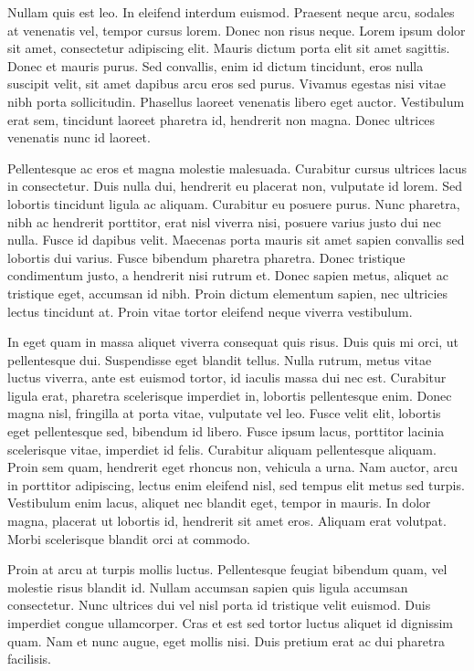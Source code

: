 \documentclass[a4paper]{article}
\begin{document}
Nullam quis est leo. In eleifend interdum euismod. Praesent neque arcu, sodales at venenatis vel, tempor cursus lorem. Donec non risus neque. Lorem ipsum dolor sit amet, consectetur adipiscing elit. Mauris dictum porta elit sit amet sagittis. Donec et mauris purus. Sed convallis, enim id dictum tincidunt, eros nulla suscipit velit, sit amet dapibus arcu eros sed purus. Vivamus egestas nisi vitae nibh porta sollicitudin. Phasellus laoreet venenatis libero eget auctor. Vestibulum erat sem, tincidunt laoreet pharetra id, hendrerit non magna. Donec ultrices venenatis nunc id laoreet.

Pellentesque ac eros et magna molestie malesuada. Curabitur cursus ultrices lacus in consectetur. Duis nulla dui, hendrerit eu placerat non, vulputate id lorem. Sed lobortis tincidunt ligula ac aliquam. Curabitur eu posuere purus. Nunc pharetra, nibh ac hendrerit porttitor, erat nisl viverra nisi, posuere varius justo dui nec nulla. Fusce id dapibus velit. Maecenas porta mauris sit amet sapien convallis sed lobortis dui varius. Fusce bibendum pharetra pharetra. Donec tristique condimentum justo, a hendrerit nisi rutrum et. Donec sapien metus, aliquet ac tristique eget, accumsan id nibh. Proin dictum elementum sapien, nec ultricies lectus tincidunt at. Proin vitae tortor eleifend neque viverra vestibulum.

In eget quam in massa aliquet viverra consequat quis risus. Duis quis mi orci, ut pellentesque dui. Suspendisse eget blandit tellus. Nulla rutrum, metus vitae luctus viverra, ante est euismod tortor, id iaculis massa dui nec est. Curabitur ligula erat, pharetra scelerisque imperdiet in, lobortis pellentesque enim. Donec magna nisl, fringilla at porta vitae, vulputate vel leo. Fusce velit elit, lobortis eget pellentesque sed, bibendum id libero. Fusce ipsum lacus, porttitor lacinia scelerisque vitae, imperdiet id felis. Curabitur aliquam pellentesque aliquam. Proin sem quam, hendrerit eget rhoncus non, vehicula a urna. Nam auctor, arcu in porttitor adipiscing, lectus enim eleifend nisl, sed tempus elit metus sed turpis. Vestibulum enim lacus, aliquet nec blandit eget, tempor in mauris. In dolor magna, placerat ut lobortis id, hendrerit sit amet eros. Aliquam erat volutpat. Morbi scelerisque blandit orci at commodo.

Proin at arcu at turpis mollis luctus. Pellentesque feugiat bibendum quam, vel molestie risus blandit id. Nullam accumsan sapien quis ligula accumsan consectetur. Nunc ultrices dui vel nisl porta id tristique velit euismod. Duis imperdiet congue ullamcorper. Cras et est sed tortor luctus aliquet id dignissim quam. Nam et nunc augue, eget mollis nisi. Duis pretium erat ac dui pharetra facilisis.
\end{document}
